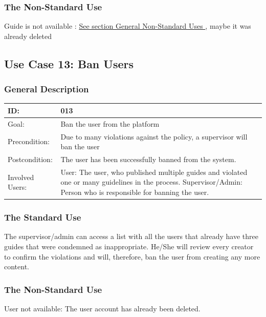 \documentclass[12pt]{article}
\theoremstyle{definition}
\newenvironment{text}{
   \setlength{\parindent}{0pt}
   \color{black}
}{}
\begin{document}
    \subsubsection{The Non-Standard Use}
\begin{text}
    Guide is not available : \hyperref[sec:gnsu]{See section General Non-Standard Uses }, maybe it was already deleted
\end{text}

\subsection{Use Case 13: Ban Users}
    \subsubsection{General Description}
    \begin{tabular}{|p{.2\linewidth}|p{.65\linewidth}|}
    \hline 
    ID: & 013 \\ \hline
    Goal: & Ban the user from the platform  \\ \hline
    Precondition: & Due to many violations against the policy, a supervisor will ban the user\\ \hline
    Postcondition: & The user has been successfully banned from the system.\\ \hline
    Involved Users: & User: The user, who published multiple guides and violated one or many guidelines in the process.
    Supervisor/Admin: Person who is responsible for banning the user. \\ \hline
    \end{tabular}
    
    \subsubsection{The Standard Use}
    \begin{text}
The supervisor/admin can access a list with all the users that already have three guides that were condemned as inappropriate. He/She will review every creator to confirm the violations and will, therefore, ban the user from creating any more content.
    \end{text}
    
    \subsubsection{The Non-Standard Use}
    \begin{text}
    User not available: The user account has already been deleted.
    \end{text}
\pagebreak
\end{document}
